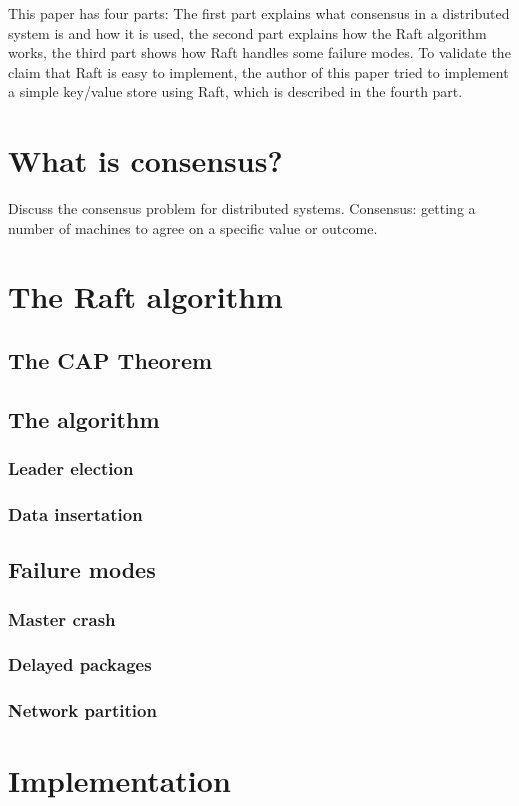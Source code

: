 This paper has four parts: The first part explains what consensus in a distributed system is and how it is used, the second part explains how the Raft algorithm works, the third part shows how Raft handles some failure modes. To validate the claim that Raft is easy to implement, the author of this paper tried to implement a simple key/value store using Raft, which is described in the fourth part.

\section{What is consensus?}

Discuss the consensus problem for distributed systems.
Consensus: getting a number of machines to agree on a specific value or outcome.

\section {The Raft algorithm}

\subsection{The CAP Theorem}

\subsection{The algorithm}

\subsubsection{Leader election}

\subsubsection{Data insertation}

\subsection{Failure modes}

\subsubsection{Master crash}

\subsubsection{Delayed packages}

\subsubsection{Network partition}

\section {Implementation}


